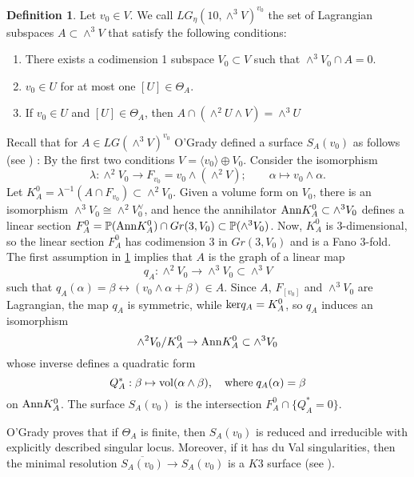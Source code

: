 \documentclass[a4paper,11pt]{amsart}
\theoremstyle{definition}
\newtheorem{defi}[thm]{Definition}
\numberwithin{equation}{section}
\numberwithin{equation}{section} \theoremstyle{definition}
\begin{document}
 \begin{defi}\label{OGradyassumption}
 Let $v_0\in V$.  We call $LG_\eta(10,\wedge^3 V)^{v_0}$ the set of Lagrangian subspaces $A\subset \wedge^3 V$ that satisfy the following conditions:
 
 \begin{enumerate}
 \item There exists a codimension 1 subspace $V_0 \subset V$ such that $\wedge^3 V_0\cap A = {0}$.
 \item $v_0\in U$ for at most one $[U]\in \Theta_A$.
 \item If $v_0\in U$ and $[U]\in \Theta_A$, then $A\cap(\wedge^2 U\wedge V)=\wedge^3U$
 \end{enumerate}
 
 \end{defi}
 Recall that for $A\in LG(\wedge^3 V)^{v_0}$ O'Grady defined a surface $S_A(v_0)$ as follows (see \cite{Ogrady-michigan}) : By the first two conditions $V=\langle v_0\rangle\oplus V_0$.
 Consider the isomorphism
 \[
 \lambda: \wedge^2V_0\to F_{v_0}=v_0\wedge (\wedge^2V);\qquad \alpha\mapsto v_0\wedge\alpha.
 \]
 Let $K_A^0=\lambda^{-1}(A\cap F_{v_0})\subset \wedge^2V_0$.  Given a volume form on $V_0$, there is an isomorphism $\wedge^3V_0\cong \wedge^2V_0^{\vee} $, and hence the annihilator ${\rm Ann} K_A^0\subset \wedge^3V_0$ defines a linear section $F_A^0={{\mathbb{P}}}({\rm Ann} K_A^0)\cap Gr(3,V_0)\subset{{\mathbb{P}}}(\wedge^3 V_0)$.
 Now, $K_A^0$ is $3$-dimensional, so the linear section $F_A^0$ has codimension $3$ in $Gr(3,V_0)$ and is a Fano $3$-fold.
 The first assumption in \ref{OGradyassumption}  implies that $A$ is the graph of a linear map 
 \[
 q_A: \wedge^2 V_0\to \wedge^3V_0\subset\wedge^3V
 \]
  such that $q_A(\alpha)=\beta\leftrightarrow (v_0\wedge\alpha+\beta)\in A$.  Since $A$, $F_{[v_0]}$ and $\wedge^3 V_0$ are Lagrangian, the map $q_A$ is symmetric, while ${\rm ker} q_A=K_A^0$, so $q_A $ induces an isomorphism 
  \[
  \wedge^2V_0/K_A^0\to {\rm Ann} K_A^0\subset \wedge^3V_0
  \]
   whose inverse defines a quadratic form 
   \[
   Q^*_A: \beta\mapsto {\rm vol}(\alpha\wedge \beta),\quad  {\rm where}\; q_A(\alpha)=\beta 
   \] 
   on ${\rm Ann} K_A^0$.  The surface $S_A(v_0)$ is the intersection $F_A^0\cap \{Q^*_A=0\}$.
 
 O'Grady proves that if $\Theta_A$ is finite, then $S_A(v_0)$ is reduced and irreducible
 with explicitly described singular locus.
 Moreover, if it has du Val singularities, then the minimal resolution $\overline{S_A(v_0)}\to S_A(v_0)$ is a $K3$ surface (see \cite[Corollaries ~4.7 and 4.8]{Ogrady-michigan}).
 
\end{document}
